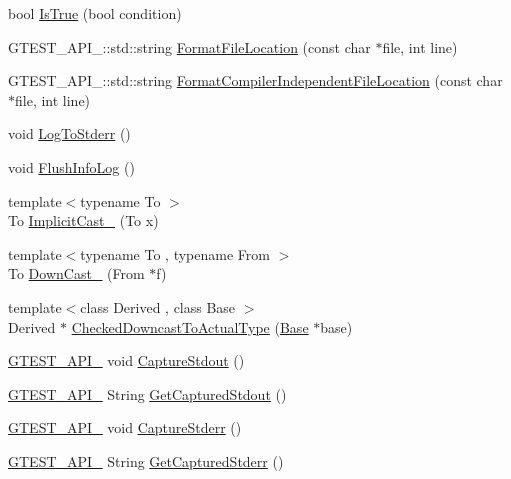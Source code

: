 \begin{DoxyCompactItemize}
\item 
bool \hyperlink{namespacetesting_1_1internal_a68c8009eb16c787f90cd989f57fb3a9a}{\-Is\-True} (bool condition)
\item 
\-G\-T\-E\-S\-T\-\_\-\-A\-P\-I\-\_\-\-::std\-::string \hyperlink{namespacetesting_1_1internal_a6264f0605b7d7d0609eae663c58662c0}{\-Format\-File\-Location} (const char $\ast$file, int line)
\item 
\-G\-T\-E\-S\-T\-\_\-\-A\-P\-I\-\_\-\-::std\-::string \hyperlink{namespacetesting_1_1internal_ae75f0742876f6d9ba86daf5603bf2448}{\-Format\-Compiler\-Independent\-File\-Location} (const char $\ast$file, int line)
\item 
void \hyperlink{namespacetesting_1_1internal_a7d7631cb9c19962577211ac1a7a85c58}{\-Log\-To\-Stderr} ()
\item 
void \hyperlink{namespacetesting_1_1internal_ad710fa1866764bda3ad3967c16cd175f}{\-Flush\-Info\-Log} ()
\item 
{\footnotesize template$<$typename To $>$ }\\\-To \hyperlink{namespacetesting_1_1internal_a2325f52b5fc175b38659b403b1676d4b}{\-Implicit\-Cast\-\_\-} (\-To x)
\item 
{\footnotesize template$<$typename To , typename From $>$ }\\\-To \hyperlink{namespacetesting_1_1internal_a84fb993f062577fc1cef4ab3ba8c338d}{\-Down\-Cast\-\_\-} (\-From $\ast$f)
\item 
{\footnotesize template$<$class Derived , class Base $>$ }\\\-Derived $\ast$ \hyperlink{namespacetesting_1_1internal_a22ab23048d3e68df507bc066b4296c48}{\-Checked\-Downcast\-To\-Actual\-Type} (\hyperlink{classBase}{\-Base} $\ast$base)
\item 
\hyperlink{gtest-port_8h_aa73be6f0ba4a7456180a94904ce17790}{\-G\-T\-E\-S\-T\-\_\-\-A\-P\-I\-\_\-} void \hyperlink{namespacetesting_1_1internal_a718cfee4d4a208dc7ad676c595d554b2}{\-Capture\-Stdout} ()
\item 
\hyperlink{gtest-port_8h_aa73be6f0ba4a7456180a94904ce17790}{\-G\-T\-E\-S\-T\-\_\-\-A\-P\-I\-\_\-} \-String \hyperlink{namespacetesting_1_1internal_a977b8cfd6046a663886eb4e21af6a3d0}{\-Get\-Captured\-Stdout} ()
\item 
\hyperlink{gtest-port_8h_aa73be6f0ba4a7456180a94904ce17790}{\-G\-T\-E\-S\-T\-\_\-\-A\-P\-I\-\_\-} void \hyperlink{namespacetesting_1_1internal_a9d04e05ff990eeca8cb2698745f0d81b}{\-Capture\-Stderr} ()
\item 
\hyperlink{gtest-port_8h_aa73be6f0ba4a7456180a94904ce17790}{\-G\-T\-E\-S\-T\-\_\-\-A\-P\-I\-\_\-} \-String \hyperlink{namespacetesting_1_1internal_a70e6787ffdc73dd85d22cfaef51ade96}{\-Get\-Captured\-Stderr} ()

\end{DoxyCompactItemize}
